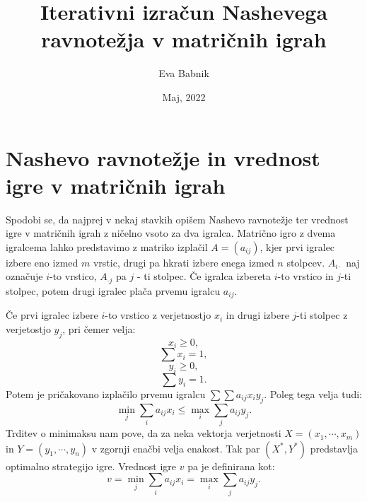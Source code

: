\documentclass[a4paper,12pt]{article}
\begin{document}
\title{ Iterativni izračun Nashevega ravnotežja v matričnih igrah}
\author{Eva Babnik}
\date{Maj, 2022}
\maketitle


\newpage
\section{Nashevo ravnotežje in vrednost igre v matričnih igrah}

Spodobi se, da najprej v nekaj stavkih opišem Nashevo ravnotežje ter vrednost igre v matričnih igrah z ničelno vsoto za dva igralca. 
Matrično igro z dvema igralcema lahko predstavimo z matriko izplačil $A=(a_{ij})$, kjer prvi igralec izbere eno izmed $m$ vrstic, drugi pa hkrati izbere enega izmed
$n$ stolpcev. $A_{i\cdot}$ naj označuje $i$-to vrstico, $A_{\cdot j}$ pa $j$ - ti stolpec. Če igralca izbereta $i$-to vrstico in $j$-ti stolpec, potem drugi igralec plača prvemu igralcu $a_{ij}$. \par
Če prvi igralec izbere $i$-to vrstico z verjetnostjo $x_i$ in drugi izbere $j$-ti stolpec z verjetostjo $y_j$, pri čemer velja:
\begin{equation}
    \label{eqn:e1}
    x_i \geq 0,
\end{equation}
\begin{equation}
    \label{eqn:e2}
    \sum x_i = 1,
\end{equation}
\begin{equation}
    \label{eqn:e3}
y_i \geq 0,
\end{equation}
\begin{equation}
    \label{eqn:e4}
    \sum y_i = 1.
\end{equation}
Potem je pričakovano izplačilo prvemu igralcu $\sum \sum a_{ij}x_i y_j$. Poleg tega velja tudi:
\begin{equation*}
    \min_j \sum_i a_{ij}x_i \leq \max_i \sum_j a_{ij} y_j.
\end{equation*}
Trditev o minimaksu nam pove, da za neka vektorja verjetnosti $X = (x_1, \cdots, x_m)$ in $Y = (y_1, \cdots, y_n)$ v zgornji enačbi velja enakost. Tak par $(X^*, Y^*)$
predstavlja optimalno strategijo igre. Vrednost igre $v$ pa je definirana kot:
\begin{equation*}
    v = \min_j \sum_{i} a_{ij}x_i = \max_i \sum_j a_{ij} y_j.
\end{equation*}
\end{document}
